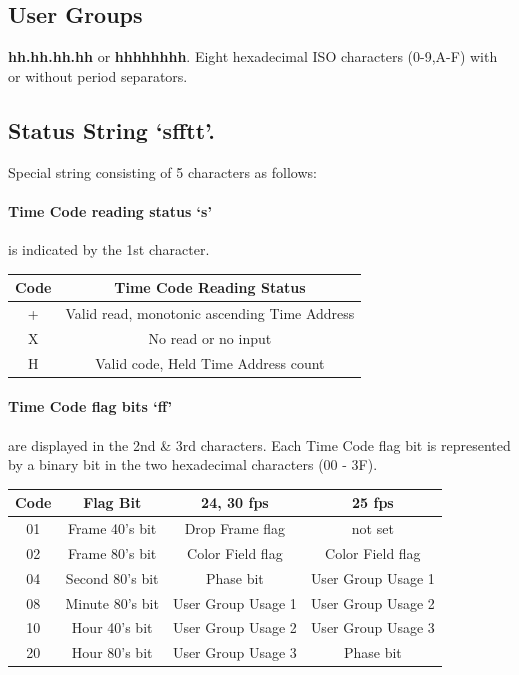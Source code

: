 \documentclass{article}
\begin{document}
	\subsection{User Groups}\label{user-groups}
		\textbf{hh.hh.hh.hh} or \textbf{hhhhhhhh}.
		Eight hexadecimal ISO characters (0-9,A-F) with or without period separators.
	
	\subsection{Status String `sfftt'.}\label{status-string-sfftt.}
		Special string consisting of 5 characters as follows:
			\paragraph{Time Code reading status	`s'}\label{time-code-reading-status-s}
			is indicated by the 1st character.
				\begin{center}
					\begin{tabular}{|c|c|}
						\hline
						Code & Time Code Reading Status \\
						\hline
			        	+ & Valid read, monotonic ascending Time Address \\ 
						X & No read or no input \\ 
						H & Valid code, Held Time Address count \\
						\hline
					\end{tabular}
				\end{center}
	
			\paragraph{Time Code flag bits `ff'}\label{time-code-flag-bits-ff}	
				are displayed in the 2nd \& 3rd characters. Each Time Code flag bit is
				represented by a binary bit in the two hexadecimal characters (00 - 3F).
				\begin{center}
					\begin{tabular}{|c|c|c|c|}
						\hline
						Code & Flag Bit & 24, 30 fps & 25 fps \\ 
						\hline
						01 & Frame 40's bit & Drop Frame flag & not set \\ 
						02 & Frame 80's bit & Color Field flag & Color Field flag \\ 
						04 & Second 80's bit & Phase bit & User Group Usage 1 \\ 
						08 & Minute 80's bit & User Group Usage 1 & User Group Usage 2 \\ 
						10 & Hour 40's bit & User Group Usage 2 & User Group Usage 3 \\ 
						20 & Hour 80's bit & User Group Usage 3 & Phase bit \\
						\hline
					\end{tabular}
				\end{center}
	
\end{document}
